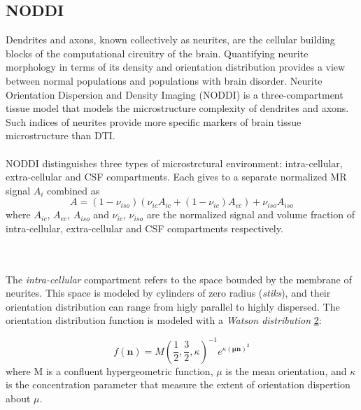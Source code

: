  \subsection{NODDI}
 Dendrites and axons, known collectively as neurites, are the cellular building blocks of the computational circuitry of the brain. Quantifying neurite morphology in terms of its density and orientation distribution provides a view between normal populations and populations with brain disorder. \cite{zhang2012noddi}
 Neurite Orientation Dispersion and Density Imaging (NODDI) is a three-compartment tissue model that models the microstructure complexity of dendrites and axons. Such indices of neurites provide more specific markers of brain tissue microstructure than DTI. \cite{zhang2012noddi}
 \\\\
 NODDI distinguishes three types of microstrctural environment: intra-cellular, extra-cellular and CSF compartments. Each gives to a separate normalized MR signal $A_i$ combined as
 \begin{equation}
   A=(1-\nu_{iso})(\nu_{ic}A_{ic}+(1-\nu_{ic})A_{ec})+\nu_{iso}A_{iso}
 \end{equation}
 where $A_{ic}$, $A_{ec}$, $A_{iso}$ and $\nu_{ic}$, $\nu_{iso}$ are the normalized signal and volume fraction of intra-cellular, extra-cellular and CSF compartments respectively.
 \begin{figure}[h]
   \centering
   \caption{}
   \label{fig:compartments}
 \end{figure}
 \\\\
 The \emph{intra-cellular} compartment refers to the space bounded by the membrane of neurites. This space is modeled by cylinders of zero radius (\emph{stiks}), and their orientation distribution can range from higly parallel to highly dispersed. The orientation distribution function is modeled with a \emph{Watson distribution} \ref{fig:watson_distribution}:
 \begin{figure}[h]
     \centering
     \caption{}
     \label{fig:watson_distribution}
 \end{figure}
 \begin{equation}
   f(\mathbf{n}) = M(\frac{1}{2},\frac{3}{2},\kappa)^{-1}e^{\kappa(\mathbf{ \mu n})^2}
 \end{equation}
 where M is a confluent hypergeometric function, $\mu$ is the mean orientation, and $\kappa$ is the concentration parameter that measure the extent of orientation dispertion about $\mu$.
